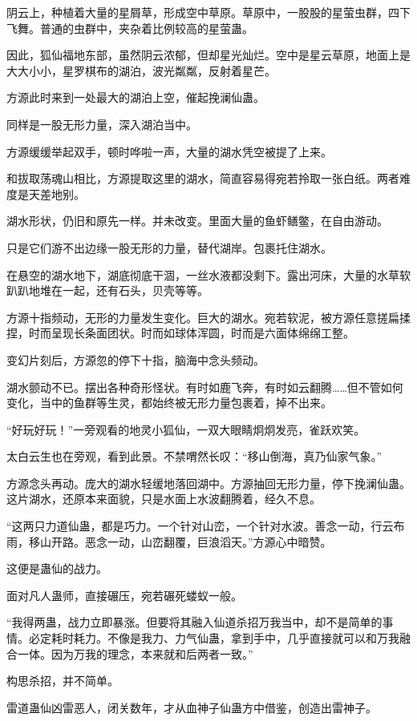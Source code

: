 \begin{this_body}
阴云上，种植着大量的星屑草，形成空中草原。草原中，一股股的星萤虫群，四下飞舞。普通的虫群中，夹杂着比例较高的星萤蛊。

因此，狐仙福地东部，虽然阴云浓郁，但却星光灿烂。空中是星云草原，地面上是大大小小，星罗棋布的湖泊，波光粼粼，反射着星芒。

方源此时来到一处最大的湖泊上空，催起挽澜仙蛊。

同样是一股无形力量，深入湖泊当中。

方源缓缓举起双手，顿时哗啦一声，大量的湖水凭空被提了上来。

和拔取荡魂山相比，方源提取这里的湖水，简直容易得宛若拎取一张白纸。两者难度是天差地别。

湖水形状，仍旧和原先一样。并未改变。里面大量的鱼虾鳝鳖，在自由游动。

只是它们游不出边缘一股无形的力量，替代湖岸。包裹托住湖水。

在悬空的湖水地下，湖底彻底干涸，一丝水液都没剩下。露出河床，大量的水草软趴趴地堆在一起，还有石头，贝壳等等。

方源十指频动，无形的力量发生变化。巨大的湖水。宛若软泥，被方源任意搓扁揉捏，时而呈现长条面团状。时而如球体浑圆，时而是六面体绵绵工整。

变幻片刻后，方源忽的停下十指，脑海中念头频动。

湖水颤动不已。摆出各种奇形怪状。有时如鹿飞奔，有时如云翻腾……但不管如何变化，当中的鱼群等生灵，都始终被无形力量包裹着，掉不出来。

“好玩好玩！”一旁观看的地灵小狐仙，一双大眼睛炯炯发亮，雀跃欢笑。

太白云生也在旁观，看到此景。不禁喟然长叹：“移山倒海，真乃仙家气象。”

方源念头再动。庞大的湖水轻缓地落回湖中。方源抽回无形力量，停下挽澜仙蛊。这片湖水，还原本来面貌，只是水面上水波翻腾着，经久不息。

“这两只力道仙蛊，都是巧力。一个针对山峦，一个针对水波。善念一动，行云布雨，移山开路。恶念一动，山峦翻覆，巨浪滔天。”方源心中暗赞。

这便是蛊仙的战力。

面对凡人蛊师，直接碾压，宛若碾死蝼蚁一般。

“我得两蛊，战力立即暴涨。但要将其融入仙道杀招万我当中，却不是简单的事情。必定耗时耗力。不像是我力、力气仙蛊，拿到手中，几乎直接就可以和万我融合一体。因为万我的理念，本来就和后两者一致。”

构思杀招，并不简单。

雷道蛊仙凶雷恶人，闭关数年，才从血神子仙蛊方中借鉴，创造出雷神子。


\end{this_body}
